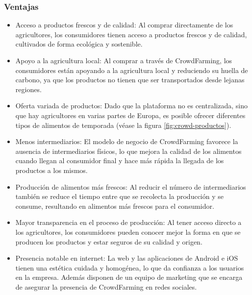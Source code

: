 

\subsubsection{Ventajas}

\begin{itemize}

	\item Acceso a productos frescos y de calidad: Al comprar directamente de los agricultores, los consumidores tienen acceso a productos frescos y de calidad, cultivados de forma ecológica y sostenible.

	\item Apoyo a la agricultura local: Al comprar a través de CrowdFarming, los consumidores están apoyando a la agricultura local y reduciendo su huella de carbono, ya que los productos no tienen que ser transportados desde lejanas regiones.

	\item Oferta variada de productos: Dado que la plataforma no es centralizada, sino que hay agricultores en varias partes de Europa, es posible ofrecer diferentes tipos de alimentos de temporada (véase la figura \ref{fig:crowd-productos}).

	\item Menos intermediarios: El modelo de negocio de CrowdFarming favorece la ausencia de intermediarios físicos, lo que mejora la calidad de los alimentos cuando llegan al consumidor final y hace más rápida la llegada de los productos a los mismos.

	\item Producción de alimentos más frescos: Al reducir el número de intermediarios también se reduce el tiempo entre que se recolecta la producción y se consume, resultando en alimentos más frescos para el consumidor.

	\item Mayor transparencia en el proceso de producción: Al tener acceso directo a los agricultores, los consumidores pueden conocer mejor la forma en que se producen los productos y estar seguros de su calidad y origen.

	\item Presencia notable en internet: La web y las aplicaciones de Android e iOS tienen una estética cuidada y homogénea, lo que da confianza a los usuarios en la empresa. Además disponen de un equipo de marketing que se encarga de asegurar la presencia de CrowdFarming en redes sociales.

\end{itemize}

